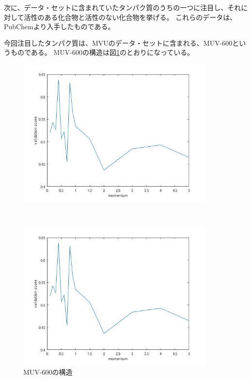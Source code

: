 \documentclass[a4j,11pt]{jarticle}
\begin{document}
次に、データ・セットに含まれていたタンパク質のうちの一つに注目し、それに対して活性のある化合物と活性のない化合物を挙げる。
これらのデータは、PubChem\cite{MUV-600}より入手したものである。

今回注目したタンパク質は、MVUのデータ・セットに含まれる、MUV-600というものである。
MUV-600の構造は図\ref{muv-600-fig}のとおりになっている。

\begin{figure}[H]
	\begin{minipage}{0.5\hsize}
		\begin{center}
			\includegraphics[width=10cm, bb=0 0 560 420]{../matlab/test.jpg}
		\end{center}
	\end{minipage}
	\begin{minipage}{0.5\hsize}
		\begin{center}
		\end{center}
	\end{minipage}
	\\
	\begin{minipage}{0.5\hsize}
		\begin{center}
			\includegraphics[width=10cm, bb=0 0 560 420]{../matlab/test.jpg}
		\end{center}
	\end{minipage}
	\begin{minipage}{0.5\hsize}
		\begin{center}
		\end{center}
	\end{minipage}
	\caption{MUV-600の構造} \label{muv-600-fig}
\end{figure}
\end{document}

